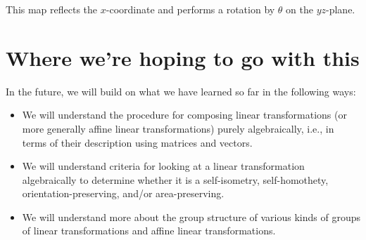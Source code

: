 \documentclass[10pt]{amsart}
\begin{document}
This map reflects the $x$-coordinate and performs a rotation by
$\theta$ on the $yz$-plane.

\section{Where we're hoping to go with this}

In the future, we will build on what we have learned so far in the
following ways:

\begin{itemize}
\item We will understand the procedure for composing linear
  transformations (or more generally affine linear transformations)
  purely algebraically, i.e., in terms of their description using
  matrices and vectors.
\item We will understand criteria for looking at a linear
  transformation algebraically to determine whether it is a
  self-isometry, self-homothety, orientation-preserving, and/or
  area-preserving.
\item We will understand more about the group structure of various
  kinds of groups of linear transformations and affine linear
  transformations.
\end{itemize}
\end{document}
